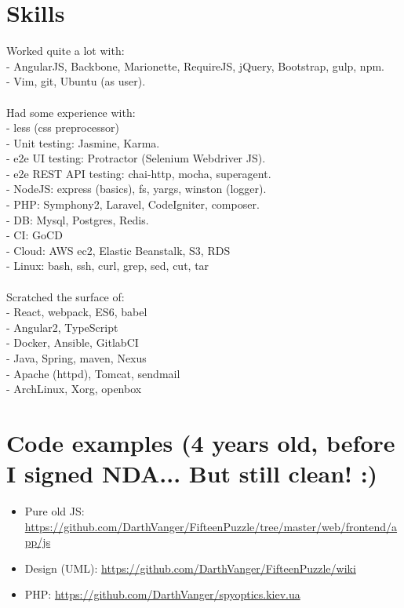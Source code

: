 \documentclass[a4paper, 14pt]{article}
\begin{document}
\section{Skills}
    Worked quite a lot with: \\
    - AngularJS, Backbone, Marionette, RequireJS, jQuery, Bootstrap, gulp, npm. \\
    - Vim, git, Ubuntu (as user). \\
    \\
    Had some experience with: \\
    - less (css preprocessor) \\
    - Unit testing: Jasmine, Karma. \\
    - e2e UI testing: Protractor (Selenium Webdriver JS). \\
    - e2e REST API testing: chai-http, mocha, superagent. \\
    - NodeJS: express (basics), fs, yargs, winston (logger). \\
    - PHP: Symphony2, Laravel, CodeIgniter, composer. \\
    - DB: Mysql, Postgres, Redis. \\
    - CI: GoCD \\
    - Cloud: AWS ec2, Elastic Beanstalk, S3, RDS \\
    - Linux: bash, ssh, curl, grep, sed, cut, tar \\
    \\
    Scratched the surface of: \\
    - React, webpack, ES6, babel \\
    - Angular2, TypeScript \\
    - Docker, Ansible, GitlabCI \\
    - Java, Spring, maven, Nexus \\
    - Apache (httpd), Tomcat, sendmail \\
    - ArchLinux, Xorg, openbox \\

\section{Code examples (4 years old, before I signed NDA... But still clean! :)}
\begin{itemize}
    \item Pure old JS: \url{https://github.com/DarthVanger/FifteenPuzzle/tree/master/web/frontend/app/js}
    \\
  \item Design (UML): \url{https://github.com/DarthVanger/FifteenPuzzle/wiki}
    \\
    \item PHP:  \url{https://github.com/DarthVanger/spyoptics.kiev.ua}
\end{itemize}
\end{document}
